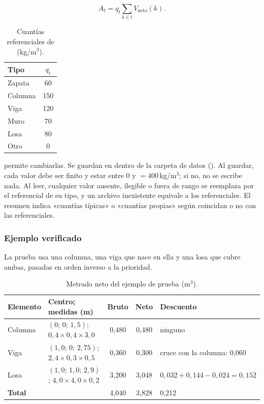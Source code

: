 \begin{equation}
	A_t = q_t \sum_{k \in t} V_{\text{neto}}(k) .
\end{equation}

\begin{table}[H]
	\centering
	\caption{Cuantías referenciales de  (kg/m$^3$).}
	\label{tab:mod-cuantias}
	\begin{tabular}{L{3cm}c}
		\hline
		\textbf{Tipo} & \textbf{$q_t$} \\ \hline
		Zapata & 60 \\
		Columna & 150 \\
		Viga & 120 \\
		Muro & 70 \\
		Losa & 80 \\
		Otro & 0 \\
		\hline
	\end{tabular}
\end{table}

 permite cambiarlas. Se guardan en  dentro de la carpeta de
datos (). Al guardar, cada valor debe ser finito y estar entre 0 y
 $= 400$\,kg/m$^3$; si no, no se escribe nada. Al leer, cualquier valor ausente, ilegible o
fuera de rango se reemplaza por el referencial de su tipo, y un archivo inexistente equivale a los referenciales. El
resumen indica «cuantías típicas» o «cuantías propias» según coincidan o no con las referenciales.

\subsubsection{Ejemplo verificado}

La prueba  usa una columna, una viga que nace en ella y
una losa que cubre ambas, pasadas en orden inverso a la prioridad.

\begin{table}[H]
	\centering
	\caption{Metrado neto del ejemplo de prueba (m$^3$).}
	\label{tab:mod-ejemplo-metrado}
	\begin{tabular}{L{2.2cm}L{5.4cm}ccL{2.6cm}}
		\hline
		\textbf{Elemento} & \textbf{Centro; medidas (m)} & \textbf{Bruto} & \textbf{Neto} & \textbf{Descuento} \\ \hline
		Columna & $(0;\,0;\,1{,}5)$; $0{,}4 \times 0{,}4 \times 3{,}0$ & 0,480 & 0,480 & ninguno \\
		Viga & $(1{,}0;\,0;\,2{,}75)$; $2{,}4 \times 0{,}3 \times 0{,}5$ & 0,360 & 0,300 & cruce con la columna: 0,060 \\
		Losa & $(1{,}0;\,1{,}0;\,2{,}9)$; $4{,}0 \times 4{,}0 \times 0{,}2$ & 3,200 & 3,048 &
		$0{,}032 + 0{,}144 - 0{,}024 = 0{,}152$ \\
		\hline
		\textbf{Total} & & 4,040 & 3,828 & 0,212 \\
		\hline
	\end{tabular}
\end{table}

